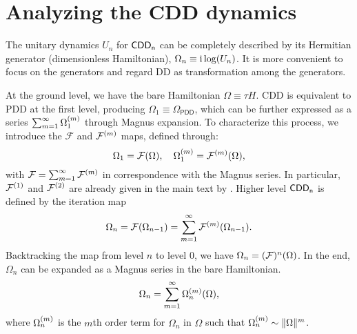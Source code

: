 \documentclass[b5paper,11pt]{article}
\newcommand{\CDDn}{\textsf{CDD\textsubscript{n}}}
\begin{document}
\newpage
\appendix
\section{Analyzing the CDD dynamics}\label{app:CDD}

The unitary dynamics $U_n$ for $\CDDn$ can be completely described by its Hermitian generator (dimensionless Hamiltonian), $\Omega_n \equiv\mathrm{i}\log(U_n)$.
It is more convenient to focus on the generators and regard 
DD as transformation among the generators.

At the ground level, we have the bare Hamiltonian $\Omega\equiv\tau H$.
CDD is equivalent to PDD at the first level, producing $\Omega_1\equiv \Omega_{\mathsf{PDD}}$, which can be further expressed as a series
 $\sum_{m=1}^\infty \Omega_1^{(m)}$ through Magnus expansion. 
 To characterize this process, we introduce the $\mathcal{F}$ and $\mathcal{F}^{(m)}$ 
 maps, defined through:
 \begin{equation}
  \Omega_1 = \mathcal{F}(\Omega), \quad \Omega_1^{(m)} = \mathcal{F}^{(m)}(\Omega),
 \end{equation}
with $\mathcal{F} = \sum_{m=1}^\infty \mathcal{F}^{(m)}$
in correspondence with the Magnus series. In particular, $\mathcal{F}^{(1)}$ and $\mathcal{F}^{(2)}$ are already given in the main text by . 
Higher level $\CDDn$ is defined by the iteration map 
\begin{equation}\label{eq:CDD-update}
    \Omega_n = \mathcal{F}(\Omega_{n-1}) = \sum_{m=1}^\infty \mathcal{F}^{(m)}(\Omega_{n-1}).
\end{equation}
Backtracking the map from level $n$ to level $0$, we have
$\Omega_{n} = (\mathcal{F})^{n}(\Omega)$. In the end, 
$\Omega_{n}$ can be expanded as a Magnus series in the bare Hamiltonian. 
\begin{equation}\label{eq:CDD-magnus}
\Omega_{n} =\sum_{m=1}^\infty \Omega_{n}^{(m)}(\Omega),
\end{equation}
where $\Omega_{n}^{(m)}$ is the $m$th order term for $\Omega_{n}$ in $\Omega$ such that $\Omega_{n}^{(m)}  \sim  \Vert {\Omega} \Vert^m$.
\end{document}
